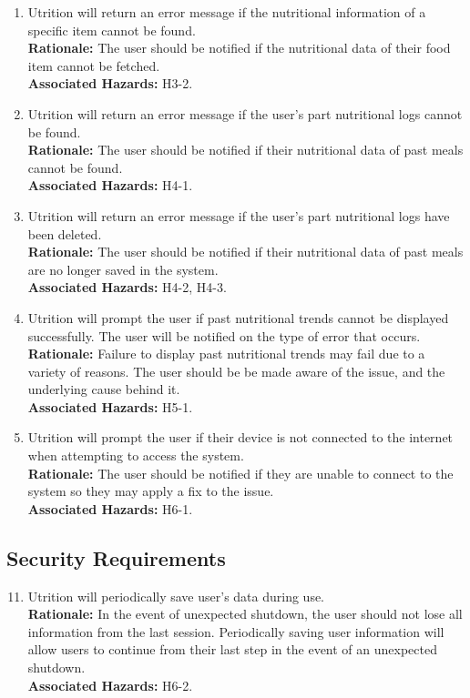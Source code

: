 \documentclass{article}
\begin{document}
\begin{enumerate}[{SR}1.]
	\item Utrition will return an error message if the nutritional information 
	of a specific item cannot be found.\\
	\textbf{Rationale:}  The user should be notified if the nutritional data of 
	their food item cannot be fetched.\\
	\textbf{Associated Hazards:} H3-2.
	
	\item Utrition will return an error message if the user's part nutritional 
	logs cannot be found.\\
	\textbf{Rationale:}  The user should be notified if their nutritional data 
	of past meals cannot be found.\\
	\textbf{Associated Hazards:} H4-1.
	
	\item Utrition will return an error message if the user's part nutritional 
	logs have been deleted.\\
	\textbf{Rationale:}  The user should be notified if their nutritional data 
	of past meals are no longer saved in the system.\\
	\textbf{Associated Hazards:} H4-2, H4-3.
	
	\item Utrition will prompt the user if past nutritional trends cannot
	be displayed successfully. The user will be notified on the type of error 
	that occurs. \\
	\textbf{Rationale:}  Failure to display past nutritional trends may fail 
	due to a variety of reasons. The user should be be made aware of the issue, 
	and the underlying cause behind it.\\	
	\textbf{Associated Hazards:} H5-1.
	
	\item Utrition will prompt the user if their device is not connected to the 
	internet when attempting to access the system. \\
	\textbf{Rationale:}  The user should be notified if they are unable to 
	connect to the system so they may apply a fix to the issue. \\	
	\textbf{Associated Hazards:} H6-1.
\end{enumerate}

\subsection{Security Requirements}
\begin{enumerate}[{SR}1.] 
	\setcounter{enumi}{10}
	
	\item Utrition will periodically save user’s data during use. \\
	\textbf{Rationale:} In the event of unexpected shutdown, the user should 
	not lose all information from the last session. Periodically saving user 
	information will allow users to continue from their last step in the event 
	of an unexpected shutdown. \\	
	\textbf{Associated Hazards:} H6-2.
\end{enumerate}
\end{document}

